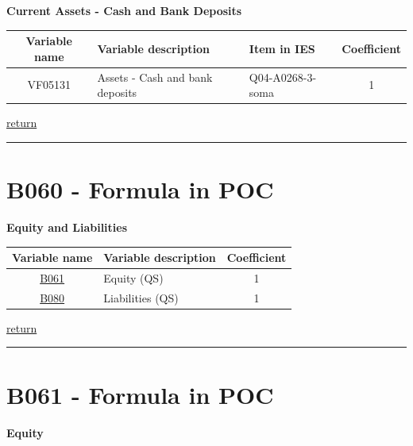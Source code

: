 \documentclass[]{book}
\begin{document}
\textbf{Current Assets - Cash and Bank Deposits}

\begin{longtable}[]{@{}cllc@{}}
\toprule
Variable name & Variable description & Item in IES & Coefficient\tabularnewline
\midrule
\endhead
VF05131 & Assets - Cash and bank deposits & Q04-A0268-3-soma & 1\tabularnewline
\bottomrule
\end{longtable}

\protect\hyperlink{assets}{return}

\begin{center}\rule{0.5\linewidth}{\linethickness}\end{center}

\hypertarget{b060---formula-in-poc}{%
\section{B060 - Formula in POC}\label{b060---formula-in-poc}}

\textbf{Equity and Liabilities}

\begin{longtable}[]{@{}clc@{}}
\toprule
Variable name & Variable description & Coefficient\tabularnewline
\midrule
\endhead
\protect\hyperlink{b061---formula-in-poc}{B061} & Equity (QS) & 1\tabularnewline
\protect\hyperlink{b080---formula-in-poc}{B080} & Liabilities (QS) & 1\tabularnewline
\bottomrule
\end{longtable}

\protect\hyperlink{equity}{return}

\begin{center}\rule{0.5\linewidth}{\linethickness}\end{center}

\hypertarget{b061---formula-in-poc}{%
\section{B061 - Formula in POC}\label{b061---formula-in-poc}}

\textbf{Equity}
\end{document}
